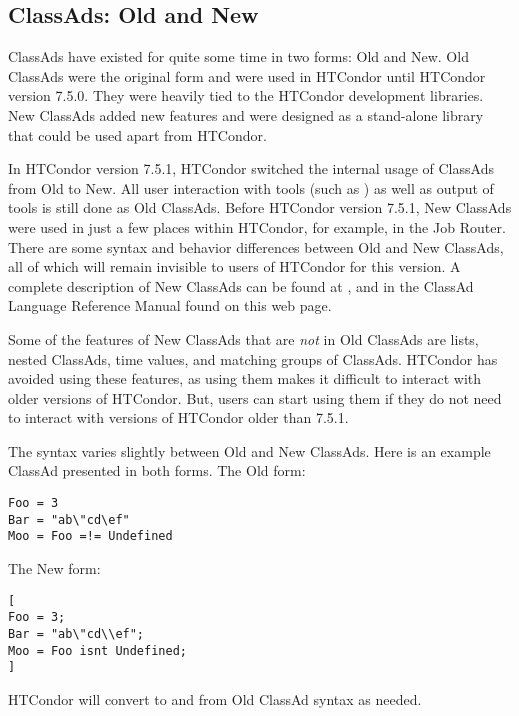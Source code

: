 \subsection{\label{sec:classad-newandold}
ClassAds: Old and New}

ClassAds have existed for quite some time in two forms:
Old and New.
Old ClassAds were the original form and were used in HTCondor
until HTCondor version 7.5.0.
They were heavily tied to the HTCondor development libraries.
New ClassAds added new features
and were designed as a stand-alone library that could be used apart
from HTCondor.

In HTCondor version 7.5.1, HTCondor switched the internal usage of
ClassAds from Old to New.
All user interaction with tools (such as ) as well as
output of tools is still done as Old ClassAds.
Before HTCondor version 7.5.1, New ClassAds were used in just a few places 
within HTCondor, 
for example, in the Job Router.
There are some syntax and behavior differences between Old and New
ClassAds,
all of which will remain invisible to users of HTCondor for this version.
A complete description of New ClassAds can be found at
,
and in the ClassAd Language Reference Manual found on this web page.

Some of the features of New ClassAds that are \emph{not} in Old ClassAds are
lists, nested ClassAds, time values, and matching groups of ClassAds.
HTCondor has avoided using these features,
as using them makes it difficult to interact with older versions of HTCondor.
But, users can start using them if they do not need to interact with
versions of HTCondor older than 7.5.1.

The syntax varies slightly between Old and New ClassAds.
Here is an example ClassAd presented in both forms.
The Old form:

\begin{verbatim}
Foo = 3
Bar = "ab\"cd\ef"
Moo = Foo =!= Undefined
\end{verbatim}

The New form:

\begin{verbatim}
[
Foo = 3;
Bar = "ab\"cd\\ef";
Moo = Foo isnt Undefined;
]
\end{verbatim}

HTCondor will convert to and from Old ClassAd syntax as needed.

